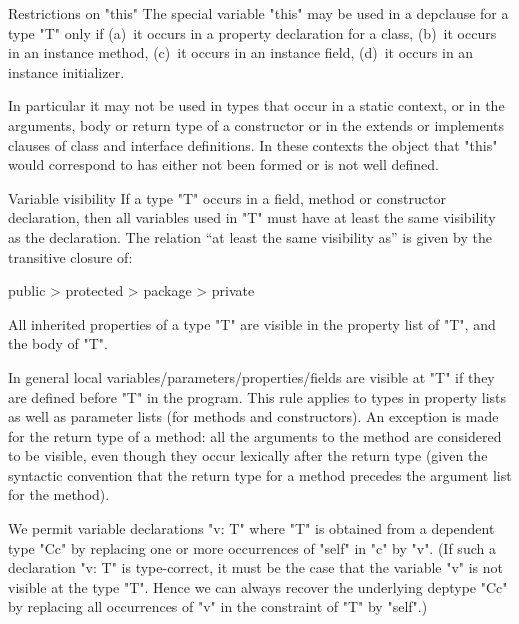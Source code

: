\begin{staticrule}{Restrictions on \xcd"this"}
  The special variable \xcd"this" may be used in a depclause for a type \xcd"T"
  only if (a)~it occurs in a property declaration for a class, (b)~it
  occurs in an instance method, (c)~it occurs in an instance field, (d)~it
  occurs in an instance initializer.
\end{staticrule}

In particular it may not be used in types that occur in a static
context, or in the arguments, body or return type of a constructor or
in the extends or implements clauses of class and interface
definitions.  In these contexts the object that \xcd"this" would
correspond to has either not been formed or is not well defined.

\begin{staticrule}{Variable visibility}
  If a type \xcd"T" occurs in a field, method or constructor
  declaration, then all variables used in \xcd"T" must have at least the
  same visibility as the declaration.  The relation ``at least the same
  visibility as'' is given by the transitive closure of:

\begin{xten}
public > protected > package > private
\end{xten}

All inherited properties of a type \xcd"T" are visible in the property
list of \xcd"T", and the body of \xcd"T".

\end{staticrule}

In general local variables/parameters/properties/fields are visible at
\xcd"T" if they are defined before \xcd"T" in the program. This rule applies to
types in property lists as well as parameter lists (for methods and
constructors).  An exception is made for the return type of a method:
all the arguments to the method are considered to be visible, even
though they occur lexically after the return type (given the \Java{}
syntactic convention that the return type for a method precedes the
argument list for the method).

We permit variable declarations \xcd"v: T" where \xcd"T" is obtained
from a dependent type \xcd"C{c}" by replacing one or more occurrences
of \xcd"self" in \xcd"c" by \xcd"v". (If such a declaration \xcd"v: T"
is type-correct, it must be the case that the variable \xcd"v" is not
visible at the type \xcd"T". Hence we can always recover the
underlying deptype \xcd"C{c}" by replacing all occurrences of \xcd"v"
in the constraint of \xcd"T" by \xcd"self".)

